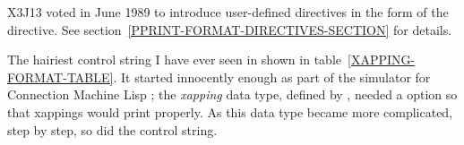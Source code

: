 \begin{new}
X3J13 voted in June 1989 
to introduce user-defined directives in the form of the
 directive.
See section~\ref{PPRINT-FORMAT-DIRECTIVES-SECTION} for details.
\end{new}

\begin{new}
The hairiest  control string I have ever seen in shown
in table~\ref{XAPPING-FORMAT-TABLE}.
It started innocently enough as part of the simulator for Connection Machine Lisp
\cite{CONNECTION-MACHINE-LISP,CMLISP-IMPLEMENTATION}; the \emph{xapping} data type,
defined by , needed a  option so that
xappings would print properly.  As this data type became more complicated, step by step,
so did the  control string.
\end{new}
